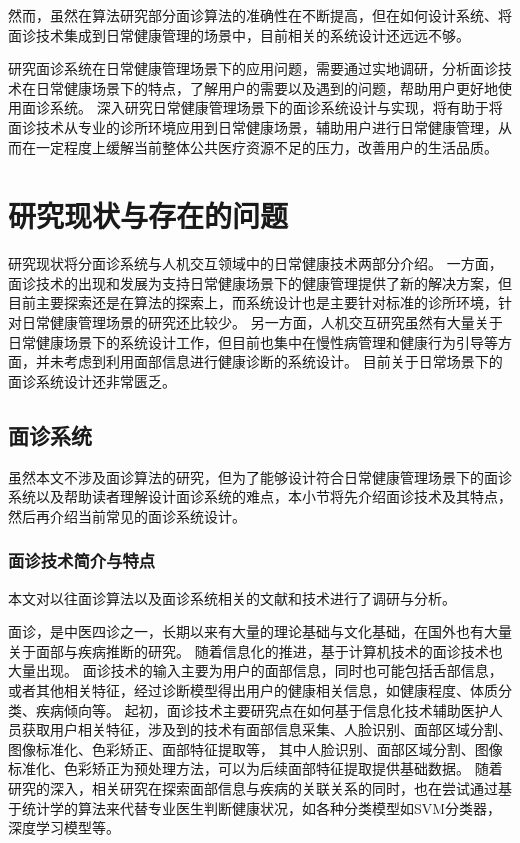 然而，虽然在算法研究部分面诊算法的准确性在不断提高，但在如何设计系统、将面诊技术集成到日常健康管理的场景中，目前相关的系统设计还远远不够。

研究面诊系统在日常健康管理场景下的应用问题，需要通过实地调研，分析面诊技术在日常健康场景下的特点，了解用户的需要以及遇到的问题，帮助用户更好地使用面诊系统。
深入研究日常健康管理场景下的面诊系统设计与实现，将有助于将面诊技术从专业的诊所环境应用到日常健康场景，辅助用户进行日常健康管理，从而在一定程度上缓解当前整体公共医疗资源不足的压力，改善用户的生活品质。

\section{研究现状与存在的问题}
研究现状将分面诊系统与人机交互领域中的日常健康技术两部分介绍。
一方面，面诊技术的出现和发展为支持日常健康场景下的健康管理提供了新的解决方案，但目前主要探索还是在算法的探索上，而系统设计也是主要针对标准的诊所环境，针对日常健康管理场景的研究还比较少。
另一方面，人机交互研究虽然有大量关于日常健康场景下的系统设计工作，但目前也集中在慢性病管理和健康行为引导等方面，并未考虑到利用面部信息进行健康诊断的系统设计。
目前关于日常场景下的面诊系统设计还非常匮乏。

\subsection{面诊系统}
虽然本文不涉及面诊算法的研究，但为了能够设计符合日常健康管理场景下的面诊系统以及帮助读者理解设计面诊系统的难点，本小节将先介绍面诊技术及其特点，然后再介绍当前常见的面诊系统设计。
\subsubsection{面诊技术简介与特点}
本文对以往面诊算法以及面诊系统相关的文献和技术进行了调研与分析。

面诊，是中医四诊之一，长期以来有大量的理论基础与文化基础，在国外也有大量关于面部与疾病推断的研究。
随着信息化的推进，基于计算机技术的面诊技术也大量出现。
面诊技术的输入主要为用户的面部信息，同时也可能包括舌部信息，或者其他相关特征，经过诊断模型得出用户的健康相关信息，如健康程度、体质分类、疾病倾向等。
起初，面诊技术主要研究点在如何基于信息化技术辅助医护人员获取用户相关特征，涉及到的技术有面部信息采集、人脸识别、面部区域分割、图像标准化、色彩矫正、面部特征提取等\cite{宋海贝2018中医面诊信息自动识别方法研究进展}，
其中人脸识别、面部区域分割、图像标准化、色彩矫正为预处理方法，可以为后续面部特征提取提供基础数据。
随着研究的深入，相关研究在探索面部信息与疾病的关联关系的同时，也在尝试通过基于统计学的算法来代替专业医生判断健康状况，如各种分类模型如SVM分类器，深度学习模型等\cite{林锋2019中医面诊系统调研报告}。

